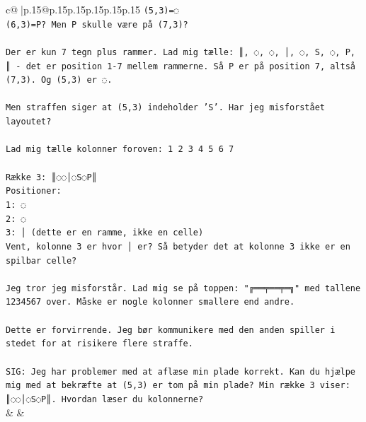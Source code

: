 \documentclass{article}
\begin{document}
{\begin{supertabular}{c@{$\;$}|p{.15\linewidth}@{}p{.15\linewidth}p{.15\linewidth}p{.15\linewidth}p{.15\linewidth}p{.15\linewidth}}
{{{\texttt{(5,3)=◌} \\
\texttt{(6,3)=P? Men P skulle være på (7,3)?} \\
\\ 
\texttt{Der er kun 7 tegn plus rammer. Lad mig tælle: ║, ◌, ◌, │, ◌, S, ◌, P, ║ {-} det er position 1{-}7 mellem rammerne. Så P er på position 7, altså (7,3). Og (5,3) er ◌.} \\
\\ 
\texttt{Men straffen siger at (5,3) indeholder 'S'. Har jeg misforstået layoutet?} \\
\\ 
\texttt{Lad mig tælle kolonner foroven: 1 2 3 4 5 6 7} \\
\\ 
\texttt{Række 3: ║◌◌│◌S◌P║} \\
\texttt{Positioner:} \\
\texttt{1: ◌} \\
\texttt{2: ◌} \\
\texttt{3: │ (dette er en ramme, ikke en celle)} \\
\texttt{Vent, kolonne 3 er hvor │ er? Så betyder det at kolonne 3 ikke er en spilbar celle?} \\
\\ 
\texttt{Jeg tror jeg misforstår. Lad mig se på toppen: "╔══╤══╤═╗" med tallene 1234567 over. Måske er nogle kolonner smallere end andre.} \\
\\ 
\texttt{Dette er forvirrende. Jeg bør kommunikere med den anden spiller i stedet for at risikere flere straffe.} \\
\\ 
\texttt{SIG: Jeg har problemer med at aflæse min plade korrekt. Kan du hjælpe mig med at bekræfte at (5,3) er tom på min plade? Min række 3 viser: ║◌◌│◌S◌P║. Hvordan læser du kolonnerne?} \\
            }
        }
    }
    & & \\ \\


\end{supertabular}}
\end{document}
